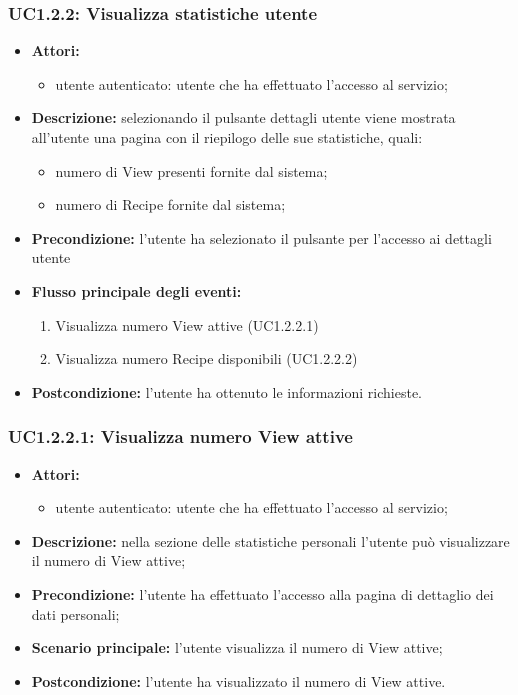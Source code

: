 \subsubsection{UC1.2.2: Visualizza statistiche utente}
\begin{itemize}
	\item \textbf{Attori:}
	\begin{itemize}
		\item utente autenticato: utente che ha effettuato l'accesso al servizio;
	\end{itemize}
	\item \textbf{Descrizione:} selezionando il pulsante dettagli utente viene mostrata all'utente una pagina con il riepilogo delle sue statistiche, quali:
	\begin{itemize}
		\item numero di View presenti fornite dal sistema;
		\item numero di Recipe fornite dal sistema;
	\end{itemize}
  \item \textbf{Precondizione:} l'utente ha selezionato il pulsante per l'accesso ai dettagli utente
	\item \textbf{Flusso principale degli eventi:}
	\begin{enumerate}
		\item Visualizza numero View attive (UC1.2.2.1)
		\item Visualizza numero Recipe disponibili (UC1.2.2.2)
	\end{enumerate}
	\item \textbf{Postcondizione:} l'utente ha ottenuto le informazioni richieste.
\end{itemize}

\subsubsection{UC1.2.2.1: Visualizza numero View attive}
\begin{itemize}
	\item \textbf{Attori:}
	\begin{itemize}
		\item utente autenticato: utente che ha effettuato l'accesso al servizio;
	\end{itemize}
	\item \textbf{Descrizione:} nella sezione delle statistiche personali l'utente può visualizzare il numero di View attive;
	\item \textbf{Precondizione:} l'utente ha effettuato l'accesso alla pagina di dettaglio dei dati personali;
	\item \textbf{Scenario principale:} l'utente visualizza il numero di View attive;
	\item \textbf{Postcondizione:} l'utente ha visualizzato il numero di View attive.
\end{itemize}


